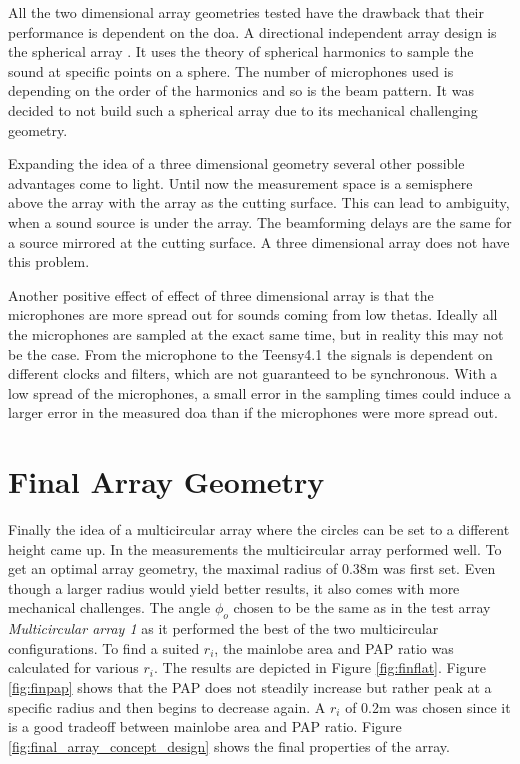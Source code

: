 All the two dimensional array geometries tested have the drawback
that their performance is dependent on the \acrshort*{doa}.
A directional independent array design is the spherical array \cite{Rafaely2010}.
It uses the theory of spherical harmonics to sample the sound at specific points
on a sphere.
The number of microphones used is depending on the order of the harmonics and so 
is the beam pattern.
It was decided to not build such a spherical array due to its mechanical 
challenging geometry.

Expanding the idea of a three dimensional geometry several other
possible advantages come to light.
Until now the measurement space is a semisphere above the array with the array as the cutting surface.
This can lead to ambiguity, when a sound source is under the array.
The beamforming delays are the same for a source mirrored at the cutting surface.
A three dimensional array does not have this problem.

Another positive effect of effect of three dimensional array is
that the microphones are more spread out for sounds 
coming from low thetas.
Ideally all the microphones are sampled at the exact same time, but in 
reality this may not be the case.
From the microphone to the Teensy4.1 the signals is dependent on different clocks and 
filters, which are not guaranteed to be synchronous.
With a low spread of the microphones, a small error in the sampling times could
induce a larger error in the measured \acrshort*{doa} than if 
the microphones were more spread out.


\newpage
\section{Final Array Geometry} \label{sec:final_array_geometry}
Finally the idea of a multicircular array where the circles can be 
set to a different height came up.
In the measurements the multicircular array performed well. 
To get an optimal array geometry, the maximal radius of 0.38m was first set.
Even though a larger radius would yield better results, it also
comes with more mechanical challenges.
The angle $\phi_o$ chosen to be the same as in the test array
\textit{Multicircular array 1} as it performed the best of the two multicircular 
configurations.
To find a suited $r_i$, the mainlobe area and PAP ratio was calculated for
various $r_i$.
The results are depicted in Figure \ref*{fig:finflat}.
Figure \ref{fig:finpap} shows that the PAP does not 
steadily increase but rather peak at a specific radius and then
begins to decrease again.
A $r_i$ of 0.2m was chosen since it is a good tradeoff between 
mainlobe area and PAP ratio.
Figure \ref*{fig:final_array_concept_design} shows the final
properties of the array.

